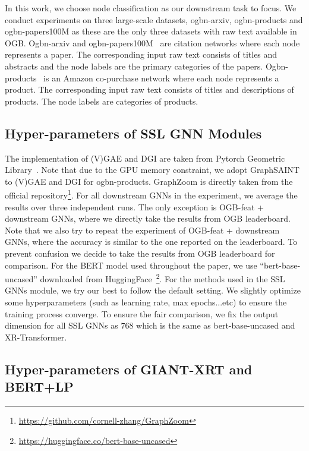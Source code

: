 \documentclass{article} %
\begin{document}
In this work, we choose node classification as our downstream task to focus. We conduct experiments on three large-scale datasets, ogbn-arxiv, ogbn-products and ogbn-papers100M as these are the only three datasets with raw text available in OGB. Ogbn-arxiv and ogbn-papers100M~\citep{wang2020microsoft,hu2020open} are citation networks where each node represents a paper. The corresponding input raw text consists of titles and abstracts and the node labels are the primary categories of the papers. Ogbn-products~\citep{chiang2019cluster,hu2020open} is an Amazon co-purchase network where each node represents a product. The corresponding input raw text consists of titles and descriptions of products. The node labels are categories of products. 

\subsection{Hyper-parameters of SSL GNN Modules}
\label{apx:hparams-ssl-baseline}

The implementation of (V)GAE and DGI are taken from Pytorch Geometric Library~\citep{fey2019fast}. Note that due to the GPU memory constraint, we adopt GraphSAINT~\citep{graphsaint-iclr20} to (V)GAE and DGI for ogbn-products. GraphZoom is directly taken from the official repository\footnote{\url{https://github.com/cornell-zhang/GraphZoom}}. For all downstream GNNs in the experiment, we average the results over three independent runs. The only exception is OGB-feat + downstream GNNs, where we directly take the results from OGB leaderboard. Note that we also try to repeat the experiment of OGB-feat + downstream GNNs, where the accuracy is similar to the one reported on the leaderboard. To prevent confusion we decide to take the results from OGB leaderboard for comparison. For the BERT model used throughout the paper, we use ``bert-base-uncased'' downloaded from HuggingFace~\footnote{\url{https://huggingface.co/bert-base-uncased}}. For the methods used in the SSL GNNs module, we try our best to follow the default setting. We slightly optimize some hyperparameters (such as learning rate, max epochs...etc) to ensure the training process converge. To ensure the fair comparison, we fix the output dimension for all SSL GNNs as $768$ which is the same as bert-base-uncased and XR-Transformer.

\subsection{Hyper-parameters of GIANT-XRT and BERT+LP}
\label{apx:hparams-giant-xrt}
\end{document}
